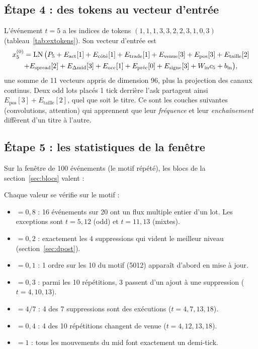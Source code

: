 \subsection{Étape 4 : des tokens au vecteur d'entrée}
L'événement $t=5$ a les indices de tokens $(1,1,1,3,3,2,2,3,1,0,3)$ (tableau~\ref{tab:extokens}). Son vecteur d'entrée est
\begin{multline}
x^{(0)}_5=\operatorname{LN}\big(P_5+E_{\text{act}}[1]+E_{\text{côté}}[1]+E_{\text{trade}}[1]+E_{\text{venue}}[3]+E_{\text{pos}}[3]+E_{\text{taille}}[2]\\
+E_{\text{spread}}[2]+E_{\Delta\text{mid}}[3]+E_{\text{occ}}[1]+E_{\text{préc}}[0]+E_{\text{signe}}[3]+W_{\text{in}}c_5+b_{\text{in}}\big),
\end{multline}
une somme de 11 vecteurs appris de dimension 96, plus la projection des canaux continus. Deux odd lots placés 1 tick derrière l'ask partagent ainsi $E_{\text{pos}}[3]+E_{\text{taille}}[2]$, quel que soit le titre. Ce sont les couches suivantes (convolutions, attention) qui apprennent que leur \emph{fréquence} et leur \emph{enchaînement} diffèrent d'un titre à l'autre.

\subsection{Étape 5 : les statistiques de la fenêtre}
Sur la fenêtre de 100 événements (le motif répété), les blocs de la section~\ref{sec:blocs} valent :
\begin{table}[H]\centering\small

\caption{Extrait des blocs de fenêtre, calculés par .}
\label{tab:exblocks}
\end{table}
\noindent Chaque valeur se vérifie sur le motif :
\begin{itemize}
\item {} $=0{,}8$ : 16 événements sur 20 ont un flux multiple entier d'un lot. Les exceptions sont $t=5,12$ (odd) et $t=11,13$ (mixtes).
\item {} $=0{,}2$ : exactement les 4 suppressions qui vident le meilleur niveau (section~\ref{sec:dpost}).
\item {} $=0{,}1$ : 1 ordre sur les 10 du motif (5012) apparaît d'abord en mise à jour.
\item {} $=0{,}3$ : parmi les 10 répétitions, 3 passent d'un ajout à une suppression ($t=4,10,13$).
\item {} $=4/7$ : 4 des 7 suppressions sont des exécutions ($t=4,7,13,18$).
\item {} $=0{,}4$ : 4 des 10 répétitions changent de venue ($t=4,12,13,18$).
\item {} $=1$ : tous les mouvements du mid font exactement un demi-tick.
\end{itemize}


